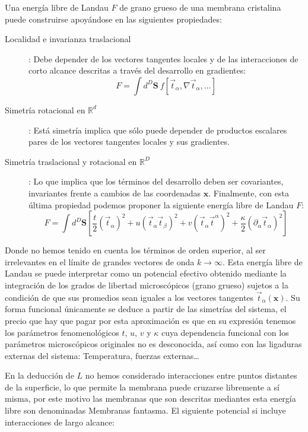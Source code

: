 Una energía libre de Landau $F$ de grano grueso de una membrana cristalina
puede construirse apoyándose en las siguientes propiedades:
\begin{description}
\item[Localidad e invarianza traslacional]: Debe depender de los vectores
  tangentes locales y de las interacciones de corto alcance descritas a través
  del desarrollo en gradientes:
  $$ F=\int\! d^D\mathbf{S}\ f[\vec{t}_{\alpha},\nabla
  \vec{t}_{\alpha},\dots]$$ 
\item[Simetría rotacional en $\mathbb{R}^d$]: Está simetría implica que sólo
  puede depender de productos escalares pares de los vectores tangentes
  locales y sus gradientes. 

\item[Simetría traslacional y rotacional en $\mathbb{R}^D$]: Lo que implica
  que los términos del desarrollo deben ser covariantes, invariantes frente a
  cambios de las coordenadas $\mathbf{x}$. Finalmente, con esta última
  propiedad podemos proponer la siguiente energía libre de Landau $F$:
  \begin{equation}
    F=\int d^D\mathbf{S}
    \left[
      \frac{t}{2}(\vec{t}_{\alpha})^2+
      u(\vec{t}_{\alpha}\vec{t}_{\beta})^2+
      v(\vec{t}_{\alpha}\vec{t}^{\alpha})^2+
      \frac{\kappa}{2}(\partial_{\alpha}\vec{t}_{\alpha})^2
    \right]
  \end{equation}
\end{description}


Donde no hemos tenido en cuenta los términos de orden superior, al ser
irrelevantes en el límite de grandes vectores de onda $k\rightarrow \infty$. 
Esta energía libre de Landau se puede interpretar como un potencial efectivo
obtenido mediante la integración de los grados de libertad microscópicos
(grano grueso) sujetos a la condición de que sus promedios sean iguales a los
vectores tangentes $\vec{t}_{\alpha}(\mathbf{x})$. Su forma funcional
únicamente se deduce a partir de las simetrías del sistema, el precio que hay
que pagar por esta aproximación es que en su expresión tenemos los parámetros
fenomenológicos $t$, $u$, $v$ y $\kappa$ cuya dependencia funcional con los
parámetros microscópicos originales no es desconocida, así como con las
ligaduras externas del sistema: Temperatura, fuerzas externas\dots  

En la deducción de $L$ no hemos considerado interacciones entre puntos
distantes de la superficie, lo que permite la membrana puede cruzarse
libremente a sí misma, por este motivo las membranas que son descritas
mediantes esta energía libre son denominadas Membranas fantasma. El siguiente
potencial si incluye interacciones de largo alcance:

